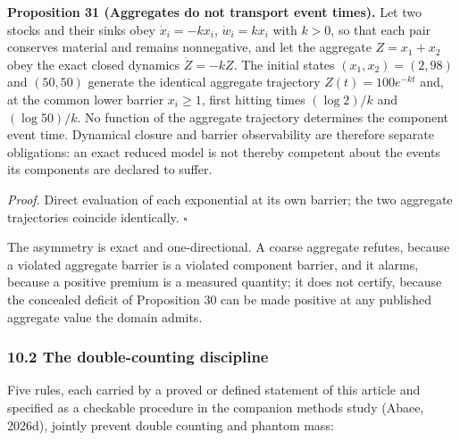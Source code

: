 \documentclass[11pt]{article}
\begin{document}
\textbf{Proposition 31 (Aggregates do not transport event times).} Let two stocks and their sinks obey
\(\dot x_i=-kx_i\), \(\dot w_i=kx_i\) with \(k>0\), so that each pair conserves material and remains
nonnegative, and let the aggregate \(Z=x_1+x_2\) obey the exact closed dynamics \(\dot Z=-kZ\). The
initial states \((x_1,x_2)=(2,98)\) and \((50,50)\) generate the identical aggregate trajectory
\(Z(t)=100e^{-kt}\) and, at the common lower barrier \(x_i\ge1\), first hitting times \((\log2)/k\)
and \((\log50)/k\). No function of the aggregate trajectory determines the component event time.
Dynamical closure and barrier observability are therefore separate obligations: an exact reduced
model is not thereby competent about the events its components are declared to suffer.

\emph{Proof.} Direct evaluation of each exponential at its own barrier; the two aggregate trajectories
coincide identically. \ensuremath{\square}

The asymmetry is exact and one-directional. A coarse aggregate refutes, because a violated aggregate
barrier is a violated component barrier, and it alarms, because a positive premium is a measured
quantity; it does not certify, because the concealed deficit of Proposition 30 can be made positive
at any published aggregate value the domain admits.


\subsubsection{10.2 The double-counting
discipline}\label{the-double-counting-discipline}

Five rules, each carried by a proved or defined statement of this article and specified as a checkable procedure in the companion methods study (Abaee, 2026d), jointly prevent double counting and phantom mass:
\end{document}
